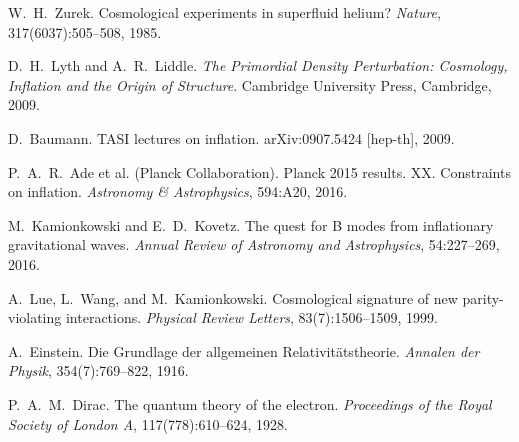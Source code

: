 \documentclass[11pt,a4paper]{article}
\numberwithin{equation}{section}
\theoremstyle{plain}
\theoremstyle{definition}
\theoremstyle{remark}
\begin{document}
\begin{thebibliography}{99}
W.~H.~Zurek.
\newblock Cosmological experiments in superfluid helium?
\newblock \emph{Nature}, 317(6037):505--508, 1985.

D.~H.~Lyth and A.~R.~Liddle.
\newblock \emph{The Primordial Density Perturbation: Cosmology, Inflation and the Origin of Structure}.
\newblock Cambridge University Press, Cambridge, 2009.

D.~Baumann.
\newblock TASI lectures on inflation.
\newblock arXiv:0907.5424 [hep-th], 2009.

P.~A.~R.~Ade et al. (Planck Collaboration).
\newblock Planck 2015 results. XX. Constraints on inflation.
\newblock \emph{Astronomy \& Astrophysics}, 594:A20, 2016.

M.~Kamionkowski and E.~D.~Kovetz.
\newblock The quest for B modes from inflationary gravitational waves.
\newblock \emph{Annual Review of Astronomy and Astrophysics}, 54:227--269, 2016.

A.~Lue, L.~Wang, and M.~Kamionkowski.
\newblock Cosmological signature of new parity-violating interactions.
\newblock \emph{Physical Review Letters}, 83(7):1506--1509, 1999.

A.~Einstein.
\newblock Die Grundlage der allgemeinen Relativitätstheorie.
\newblock \emph{Annalen der Physik}, 354(7):769--822, 1916.

P.~A.~M.~Dirac.
\newblock The quantum theory of the electron.
\newblock \emph{Proceedings of the Royal Society of London A}, 117(778):610--624, 1928.

\end{thebibliography}
\end{document}
